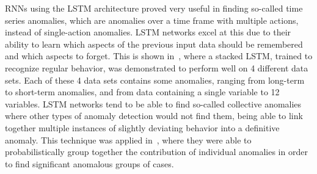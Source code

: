 RNNs using the LSTM architecture proved very useful in finding so-called time series anomalies, which are anomalies over a time frame with multiple actions, instead of single-action anomalies. LSTM networks excel at this due to their ability to learn which aspects of the previous input data should be remembered and which aspects to forget. This is shown in~\cite{malhotra2015long}, where a stacked LSTM, trained to recognize regular behavior, was demonstrated to perform well on 4 different data sets. Each of these 4 data sets contains some anomalies, ranging from long-term to short-term anomalies, and from data containing a single variable to 12 variables. LSTM networks tend to be able to find so-called collective anomalies where other types of anomaly detection would not find them, being able to link together multiple instances of slightly deviating behavior into a definitive anomaly. This technique was applied in~\cite{olsson2015probabilistic}, where they were able to probabilistically group together the contribution of individual anomalies in order to find significant anomalous groups of cases.